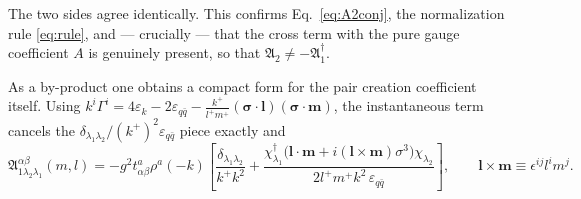 \documentclass[11pt]{article}
\newcommand{\mf}{\mathfrak}
\newcommand{\eps}{\varepsilon}
\newcommand{\dg}{\dagger}
\begin{document}
\begin{res}
The two sides agree identically. This confirms Eq.~\eqref{eq:A2conj}, the normalization rule
\eqref{eq:rule}, and --- crucially --- that the cross term with the pure gauge coefficient $A$
is genuinely present, so that $\mf A_{2}\neq-\mf A_{1}^{\dg}$.
\end{res}

\noindent
As a by-product one obtains a compact form for the pair creation coefficient itself. Using
$k^{i}\Gamma^{i}=4\eps_{k}-2\eps_{q\bar q}
-\frac{k^{+}}{l^{+}m^{+}}(\bm\sigma\!\cdot\!\bm l)(\bm\sigma\!\cdot\!\bm m)$, the instantaneous
term cancels the $\delta_{\lambda_1\lambda_2}/(k^{+})^{2}\eps_{q\bar q}$ piece exactly and
\begin{equation}
\mf A^{\alpha\beta}_{1\lambda_{2}\lambda_{1}}(m,l)
=-g^{2}t^{a}_{\alpha\beta}\rho^{a}(-k)\left[
\frac{\delta_{\lambda_1\lambda_2}}{k^{+}k^{2}}
+\frac{\chi^{\dg}_{\lambda_1}\big(\bm l\!\cdot\!\bm m+i(\bm l\times\bm m)\sigma^{3}\big)\chi_{\lambda_2}}
{2l^{+}m^{+}k^{2}\,\eps_{q\bar q}}\right],
\qquad \bm l\times\bm m\equiv\epsilon^{ij}l^{i}m^{j}.
\end{equation}
\end{document}
